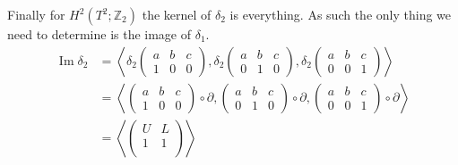 \documentclass[10pt]{article}
\newcommand{\bb}[1]{\mathbb{#1}}
\DeclareMathOperator{\img}{Im}
\theoremstyle{plain}
\theoremstyle{remark}
\begin{document}
Finally for $H^2(T^2;\bb{Z}_2)$ the kernel of $\delta_2$ is everything. As such
the only thing we need to determine is the image of $\delta_1$.
\begin{align*}
  \img \delta_2 &=
                  \left\langle\delta_2
                  \left(
                  \begin{array}{ccc}
                    a & b & c\\
                    1 & 0 & 0
                  \end{array}
                            \right),\delta_2
                            \left(
                            \begin{array}{ccc}
                              a & b & c\\
                              0 & 1 & 0
                            \end{array}
                                      \right),\delta_2
                                      \left(
                                      \begin{array}{ccc}
                                        a & b & c\\
                                        0 & 0 & 1
                                      \end{array}
                                                \right)
                                                \right\rangle\\
                &=
                  \left\langle
                  \left(
                  \begin{array}{ccc}
                    a & b & c\\
                    1 & 0 & 0
                  \end{array}
                            \right)\circ\partial,
                            \left(
                            \begin{array}{ccc}
                              a & b & c\\
                              0 & 1 & 0
                            \end{array}
                                      \right)\circ\partial,
                                      \left(
                                      \begin{array}{ccc}
                                        a & b & c\\
                                        0 & 0 & 1
                                      \end{array}
                                                \right)\circ\partial
                                                \right\rangle\\
                &=
                  \left\langle
                  \left(
                  \begin{array}{cc}
                    U&L\\
                    1&1\\
                  \end{array}
  \right)
  \right\rangle
\end{align*}
\end{document}
